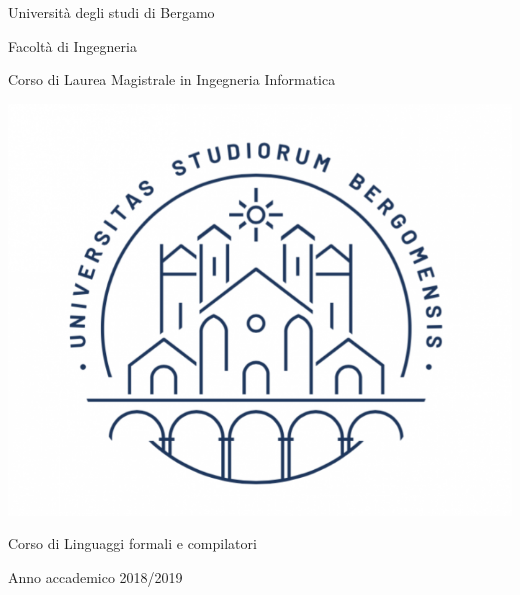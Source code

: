 \documentclass[a4paper]{article}
\begin{document}
\begin{center}
\begin{Large}
Università degli studi di Bergamo
\end{Large}
\end{center}
\begin{center}
\begin{Large}
Facoltà di Ingegneria
\end{Large}
\end{center}
\begin{center}
\begin{Large}
Corso di Laurea Magistrale in Ingegneria Informatica
\end{Large}
\end{center}

\vspace{1\baselineskip}

\begin{center}
\includegraphics[scale=0.6]{UniBG.png}
\end{center}

\vspace{1\baselineskip}

\begin{center}
\begin{Large}
Corso di Linguaggi formali e compilatori
\end{Large}
\end{center}
\begin{center}
\begin{Large}
Anno accademico 2018/2019
\end{Large}
\end{center}
\end{document}
